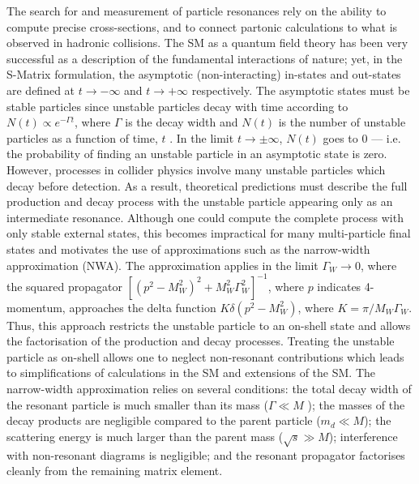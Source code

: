 \documentclass[a4paper,11pt]{article}
\begin{document}
 The search for and measurement of particle resonances rely on the ability to compute precise cross-sections, and to connect partonic calculations to what is observed in hadronic collisions. The SM as a quantum field theory has been very successful as a description of the fundamental interactions of nature; yet, in the S-Matrix formulation, the asymptotic (non-interacting) in-states and out-states are defined at $t\rightarrow-\infty$ and $t\rightarrow +\infty$ respectively\cite{Veltman:1963th}. The asymptotic states must be stable particles since unstable particles decay with time according to $N(t) \propto e^{-\Gamma t}$, where $\Gamma$ is the decay width and $N(t)$ is the number of unstable particles as a function of time, $t$ \cite{QFTLectures}. In the limit $t\rightarrow \pm \infty$, $N(t)$ goes to 0 --- i.e. the probability of finding an unstable particle in an asymptotic state is zero. However, processes in collider physics involve many unstable particles which decay before detection. As a result, theoretical predictions must describe the full production and decay process with the unstable particle appearing only as an intermediate resonance. Although one could compute the complete process with only stable external states, this becomes impractical for many multi-particle final states and motivates the use of approximations such as the narrow-width approximation (NWA). The approximation applies in the limit $\Gamma_W \rightarrow 0$, where the squared propagator $\left[(p^2 - M_W^2)^2+M_W^2\Gamma_W^2\right]^{-1}$, where $p$ indicates 4-momentum, approaches the delta function $K\delta(p^2 -M_W^2)$, where $K = \pi/M_W\Gamma_W$\cite{Kauer:2007zc}. Thus, this approach restricts the unstable particle to an on-shell state and allows the factorisation of the production and decay processes. Treating the unstable particle as on-shell allows one to neglect non-resonant contributions which leads to simplifications of calculations in the SM and extensions of the SM\cite{Uhlemann:2008pm}. The narrow-width approximation relies on several conditions: the total decay width of the resonant particle is much smaller than its mass ($\Gamma \ll M$ ); the masses of the decay products are negligible compared to the parent particle ($m_d \ll M$); the scattering energy is much larger than the parent mass ($\sqrt{s} \gg M$); interference with non-resonant diagrams is negligible; and the resonant propagator factorises cleanly from the remaining matrix element\cite{Berdine:2007uv}.\\
\end{document}
